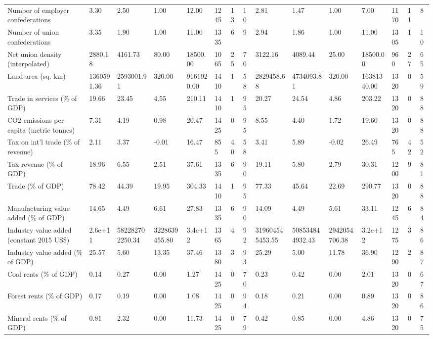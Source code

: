 \begin{longtable}{lllllllllllllll}
Number of employer confederations & 3.30 & 2.50 & 1.00 & 12.00 & 1245 & 13 & 10 & 2.81 & 1.47 & 1.00 & 7.00 & 1170 & 11 & 8\\
Number of union confederations & 3.35 & 1.90 & 1.00 & 11.00 & 1335 & 6 & 9 & 2.94 & 1.86 & 1.00 & 11.00 & 1305 & 1 & 10\\
Net union density (interpolated) & 2880.18 & 4161.73 & 80.00 & 18500.00 & 1065 & 25 & 70 & 3122.16 & 4089.44 & 25.00 & 18500.00 & 960 & 27 & 65\\
Land area (sq. km) & 1360591.36 & 2593001.91 & 320.00 & 9161920.00 & 1410 & 1 & 58 & 2829458.68 & 4734093.81 & 320.00 & 16381340.00 & 1320 & 0 & 59\\
\addlinespace
Trade in services (\% of GDP) & 19.66 & 23.45 & 4.55 & 210.11 & 1410 & 1 & 95 & 20.27 & 24.54 & 4.86 & 203.22 & 1320 & 0 & 88\\
CO2 emissions per capita (metric tonnes) & 7.31 & 4.19 & 0.98 & 20.47 & 1425 & 0 & 95 & 8.55 & 4.40 & 1.72 & 19.60 & 1320 & 0 & 88\\
Tax on int'l trade (\% of revenue) & 2.11 & 3.37 & -0.01 & 16.47 & 855 & 40 & 58 & 3.41 & 5.89 & -0.02 & 26.49 & 765 & 42 & 52\\
Tax revenue (\% of GDP) & 18.96 & 6.55 & 2.51 & 37.61 & 1335 & 6 & 90 & 19.11 & 5.80 & 2.79 & 30.31 & 1200 & 9 & 81\\
Trade (\% of GDP) & 78.42 & 44.39 & 19.95 & 304.33 & 1410 & 1 & 95 & 77.33 & 45.64 & 22.69 & 290.77 & 1320 & 0 & 88\\
\addlinespace
Manufacturing value added (\% of GDP) & 14.65 & 4.49 & 6.61 & 27.83 & 1335 & 6 & 90 & 14.09 & 4.49 & 5.61 & 33.11 & 1245 & 6 & 84\\
Industry value added (constant 2015 US\$) & 2.6e+11 & 582282702250.34 & 3228639455.80 & 3.4e+12 & 1365 & 4 & 92 & 319604545453.55 & 508534844932.43 & 2942054706.38 & 3.2e+12 & 1275 & 3 & 86\\
Industry value added (\% of GDP) & 25.57 & 5.60 & 13.35 & 37.46 & 1380 & 3 & 93 & 25.29 & 5.00 & 11.78 & 36.90 & 1290 & 2 & 87\\
Coal rents (\% of GDP) & 0.14 & 0.27 & 0.00 & 1.27 & 1425 & 0 & 70 & 0.23 & 0.42 & 0.00 & 2.01 & 1320 & 0 & 67\\
Forest rents (\% of GDP) & 0.17 & 0.19 & 0.00 & 1.08 & 1425 & 0 & 94 & 0.18 & 0.21 & 0.00 & 0.89 & 1320 & 0 & 86\\
\addlinespace
Mineral rents (\% of GDP) & 0.81 & 2.32 & 0.00 & 11.73 & 1425 & 0 & 79 & 0.42 & 0.85 & 0.00 & 4.86 & 1320 & 0 & 75\\

\end{longtable}
